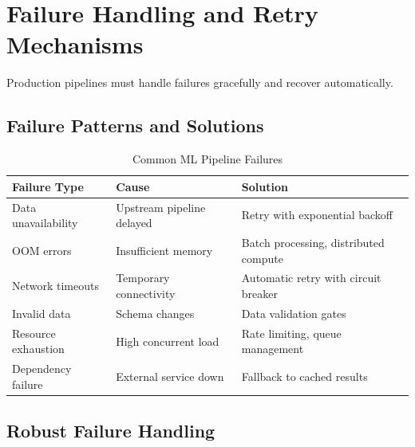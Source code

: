 \section{Failure Handling and Retry Mechanisms}

Production pipelines must handle failures gracefully and recover automatically.

\subsection{Failure Patterns and Solutions}

\begin{table}[h]
\centering
\caption{Common ML Pipeline Failures}
\label{tab:pipeline_failures}
\small
\begin{tabular}{@{}lp{4cm}p{4.5cm}@{}}
\toprule
\textbf{Failure Type} & \textbf{Cause} & \textbf{Solution} \\
\midrule
Data unavailability & Upstream pipeline delayed & Retry with exponential backoff \\
OOM errors & Insufficient memory & Batch processing, distributed compute \\
Network timeouts & Temporary connectivity & Automatic retry with circuit breaker \\
Invalid data & Schema changes & Data validation gates \\
Resource exhaustion & High concurrent load & Rate limiting, queue management \\
Dependency failure & External service down & Fallback to cached results \\
\bottomrule
\end{tabular}
\end{table}

\subsection{Robust Failure Handling}

